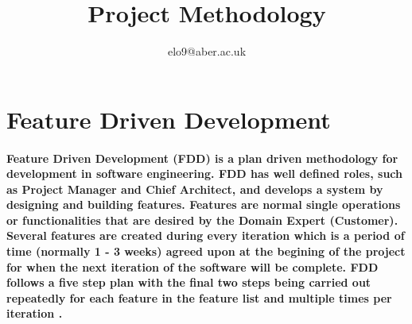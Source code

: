 \documentclass{article}
\title{Project Methodology}
\author{elo9@aber.ac.uk}
\begin{document}
\maketitle
\tableofcontents

\newpage

\section{Feature Driven Development}
\paragraph{Feature Driven Development (FDD) is a plan driven methodology for development in software engineering. FDD has well defined roles, such as Project Manager and Chief Architect, and develops a system by designing and building features. Features are normal single operations or functionalities that are desired by the Domain Expert (Customer). Several features are created during every iteration which is a period of time (normally 1 - 3 weeks) agreed upon at the begining of the project for when the next iteration of the software will be complete. FDD follows a five step plan with the final two steps being carried out repeatedly for each feature in the feature list and multiple times per iteration \cite{FDDandAgile}.}
\end{document}
